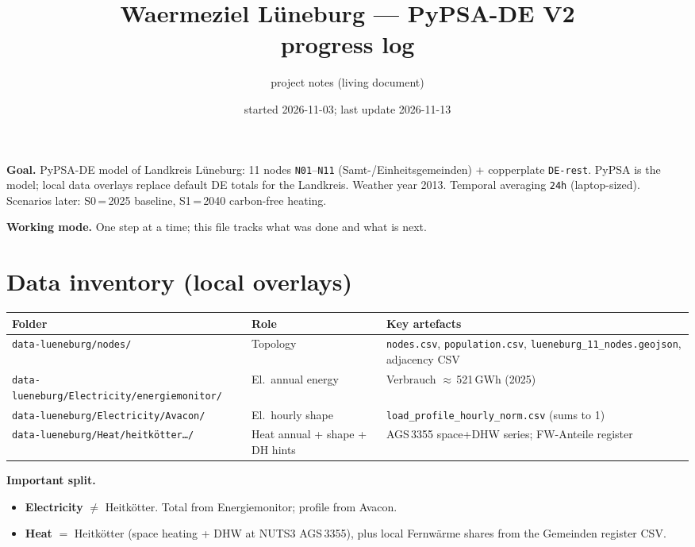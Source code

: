 \documentclass[11pt,a4paper]{article}
\title{Waermeziel Lüneburg --- PyPSA-DE V2\\progress log}
\author{project notes (living document)}
\date{started 2026-11-03; last update 2026-11-13}
\begin{document}
\maketitle

\noindent\textbf{Goal.}
PyPSA-DE model of Landkreis Lüneburg:
11 nodes \texttt{N01}--\texttt{N11} (Samt-/Einheitsgemeinden) + copperplate \texttt{DE-rest}.
PyPSA is the model; local data overlays replace default DE totals for the Landkreis.
Weather year 2013. Temporal averaging \texttt{24h} (laptop-sized).
Scenarios later: S0\,=\,2025 baseline, S1\,=\,2040 carbon-free heating.

\noindent\textbf{Working mode.}
One step at a time; this file tracks what was done and what is next.

\tableofcontents
\vspace{1em}

\section{Data inventory (local overlays)}

\begin{center}
\begin{tabular}{@{}llp{6.2cm}@{}}
\toprule
Folder & Role & Key artefacts \\
\midrule
\texttt{data-lueneburg/nodes/} & Topology & \texttt{nodes.csv}, \texttt{population.csv},
  \texttt{lueneburg\_11\_nodes.geojson}, adjacency CSV \\
\texttt{data-lueneburg/Electricity/energiemonitor/} & El.\ annual energy & Verbrauch $\approx$\,521\,GWh (2025) \\
\texttt{data-lueneburg/Electricity/Avacon/} & El.\ hourly shape & \texttt{load\_profile\_hourly\_norm.csv} (sums to 1) \\
\texttt{data-lueneburg/Heat/heitkötter\ldots/} & Heat annual + shape + DH hints & AGS\,3355 space+DHW series; FW-Anteile register \\
\bottomrule
\end{tabular}
\end{center}

\textbf{Important split.}
\begin{itemize}[leftmargin=*]
  \item \textbf{Electricity} $\neq$ Heitkötter.
        Total from Energiemonitor; profile from Avacon.
  \item \textbf{Heat} $=$ Heitkötter (space heating + DHW at NUTS3 AGS\,3355),
        plus local Fernwärme shares from the Gemeinden register CSV.
\end{itemize}
\end{document}
